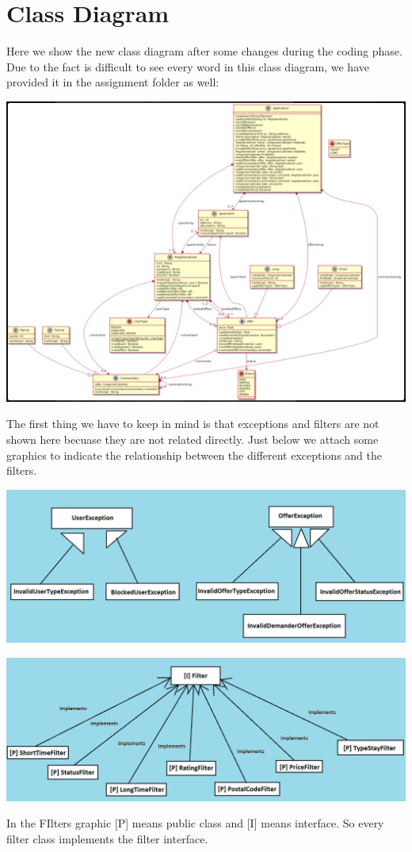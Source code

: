 \documentclass[12pt]{article}
\begin{document}
\section{Class Diagram}
Here we show the new class diagram after some changes during the coding phase. Due to the fact is difficult to see every word in this class diagram, we have provided it in the assignment folder as well:
\begin{center}
	\includegraphics[scale=1]{ClassDiagram.PNG}
\end{center}
The first thing we have to keep in mind is that exceptions and filters are not shown here becuase they are not related directly. Just below we attach some graphics to indicate the relationship between the different exceptions and the filters.
\begin{center}
	\includegraphics[scale=0.8]{ExceptionsGraphic.PNG}
\end{center}
\begin{center}
	\includegraphics[scale=0.8]{FiltersGraphic.PNG}
\end{center}
In the FIlters graphic [P] means public class and [I] means interface. So every filter class implements the filter interface.\\
\end{document}
